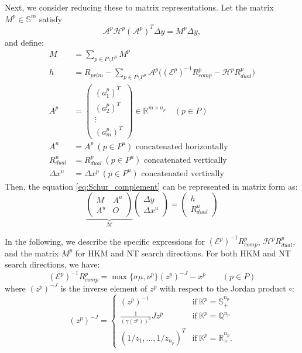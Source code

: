 \documentclass{scrartcl}
\begin{document}
Next, we consider reducing these to matrix representations. Let the matrix $M^p \in \mathbb{S}^{m}$ satisfy
\[
    \mathcal{A}^p\mathcal{H}^p(\mathcal{A}^p)^T \Delta y= M^p \Delta y,
\]
and define:
\begin{align*}
    M &= \sum_{p \in P \setminus P^u} M^p \\
    h &= R_{prim} - \sum_{p \in P \setminus P^u} \mathcal{A}^p\big((\mathcal{E}^p)^{-1}R_{comp}^p - \mathcal{H}^p R_{dual}^p\big)\\
    A^p &= \begin{pmatrix}
        (a^p_1)^T\\
        (a^p_2)^T\\
        \vdots\\
        (a^p_m)^T
    \end{pmatrix} \in \mathbb{R}^{m\times n_p} \quad (p\in P)\\
    A^u &= A^p ~ (p\in P^u)\text{ concatenated horizontally}\\
    R^u_{dual} &= R^p_{dual} ~ (p\in P^u)\text{ concatenated vertically}\\
    \Delta x^u &= \Delta x^p ~ (p\in P^u)\text{ concatenated vertically}
\end{align*}
Then, the equation \eqref{eq:Schur_complement} can be represented in matrix form as:
\[
    \underbrace{\left(\begin{array}{cc}
        M   & A^u \\
        A^u & O
    \end{array}\right)}_{\mathcal{M}}
    \left(\begin{array}{c}
        \Delta y   \\
        \Delta x^u 
    \end{array}\right) 
    = 
    \left(\begin{array}{c}
         h  \\
         R_{dual}^u 
    \end{array}
    \right)
    \label{eq:Schur_complement_Mat}
\]

In the following, we describe the specific expressions for $(\mathcal{E}^p)^{-1}R^p_{comp}$, $\mathcal{H}^p R^p_{dual}$, and the matrix $M^p$ for HKM and NT search directions. For both HKM and NT search directions, we have:
\[
    (\mathcal{E}^p)^{-1}R^p_{comp} = \max\{\sigma\mu, \nu^p\}(z^p)^{-J} - x^p \qquad (p \in P)
\]
where $(z^p)^{-J}$ is the inverse element of $z^p$ with respect to the Jordan product $\circ$:
\[
    (z^p)^{-J} = \begin{cases}
        (z^p)^{-1} & \text{if} ~ \mathbb{K}^p=\mathbb{S}^{n_p}_+ \\
        \frac{1}{(\gamma(z^p))^2} J z^p & \text{if} ~ \mathbb{K}^p=\mathbb{Q}^{n_p} \\
        (1/z_1, \ldots, 1/z_{n_p})^T & \text{if} ~ \mathbb{K}^p=\mathbb{R}^{n_p}_+.
    \end{cases}
\]
\end{document}
